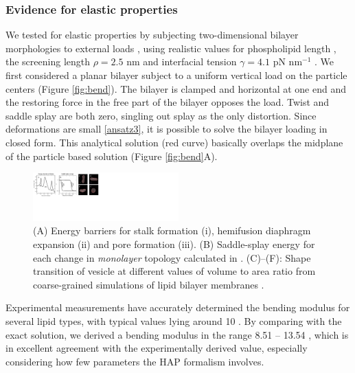 \subsubsection{Evidence for elastic properties}
\label{sssec:evidence}
We tested for elastic properties by subjecting two-dimensional bilayer morphologies
to external loads \cite{Fu2018_SIAM}, using realistic
values for phospholipid length \cite{Boal},
the screening length $\rho = 2.5$ nm \cite{Eriksson1989,Lin2005,Parsegian,Israelachvili80,TerziDeserno17}
and  interfacial tension $\gamma=4.1$ pN nm$^{-1}$  \cite{GarciaSaez, KUZMIN2005, Petelska2012}.
We first considered a planar bilayer subject to a uniform vertical load on the particle centers (Figure \ref{fig:bend}). 
The bilayer is clamped and horizontal at one end and the restoring force in the free part 
of the bilayer opposes the load. Twist and saddle splay are both zero, singling out splay
as the only distortion.
Since deformations are small \eqref{ansatz3}, it is possible to solve the bilayer loading in closed form. 
This analytical solution (red curve) basically overlaps the midplane of the particle based solution (Figure \ref{fig:bend}A). 

\begin{figure}
\centerline{\includegraphics[width=0.5\textwidth]{figures/SA1_fig3.pdf}}
\caption{{\footnotesize (A) Energy barriers for stalk formation (i), hemifusion
diaphragm expansion (ii) and pore formation (iii). 
(B) Saddle-splay energy for each change in \emph{monolayer} topology
calculated in \cite{RyKlYaCo16}. (C)--(F): Shape transition of vesicle
  at different values of volume to area ratio from coarse-grained
  simulations of lipid bilayer membranes \cite{Fu2017}.}}
\label{fig:barriers}
\end{figure}
Experimental measurements have accurately determined 
the bending modulus for several lipid types, with 
typical values lying around 10 \kBT\; \cite{Naetal15,VeBrPa15,NAGLE2000159,PhysRevLett.113.248102}.
By comparing with the exact solution, we derived a bending modulus
in the range 8.51 -- 13.54 \kBT, which is in 
excellent agreement with the experimentally derived value, especially considering how few parameters the HAP 
formalism involves. 

